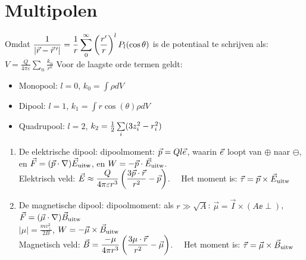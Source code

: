 \documentclass[twoside]{report}
\begin{document}
\section{Multipolen}
Omdat
$\displaystyle
\frac{1}{|\vec{r}-\vec{r}\,'|}=\frac{1}{r}\sum_0^\infty\left(\frac{r'}{r}\right)^lP_l(\cos\theta)
$ is de potentiaal te schrijven als:
$\displaystyle V=\frac{Q}{4\pi\varepsilon}\sum_n\frac{k_n}{r^n}$
\npar
Voor de laagste orde termen geldt:
\begin{itemize}
\item Monopool: $l=0$, $k_0=\int\rho dV$
\item Dipool: $l=1$, $k_1=\int r\cos(\theta)\rho dV$
\item Quadrupool: $l=2$, $k_2=\mbox{$\frac{1}{2}$}\sum\limits_i(3z^2_i-r^2_i)$
\end{itemize}
\begin{enumerate}
\item De elektrische dipool: dipoolmoment: $\vec{p}=Ql\vec{e}_{\rm }$, waarin $\vec{e}_{\rm }$
      loopt van $\oplus$ naar $\ominus$, en\linebreak
      $\vec{F}=(\vec{p}\cdot\nabla)\vec{E}_{\rm uitw}$, en
      $W=-\vec{p}\cdot\vec{E}_{\rm uitw}$.\\
      Elektrisch veld: $\displaystyle \vec{E}\approx\frac{Q}{4\pi\varepsilon r^3}\left(\frac{3\vec{p}\cdot\vec{r}}{r^2}-\vec{p}\right)$.~~
      Het moment is: $\vec{\tau}=\vec{p}\times\vec{E}_{\rm uitw}$
\item De magnetische dipool: dipoolmoment: als $r\gg\sqrt{A}$: $\vec{\mu}=\vec{I}\times(A\ee{\perp})$,
      $\vec{F}=(\vec{\mu}\cdot\nabla)\vec{B}_{\rm uitw}$\\
      $\displaystyle|\mu|=\frac{mv^2_\perp}{2B}$, $W=-\vec{\mu}\times\vec{B}_{\rm uitw}$\\
      Magnetisch veld: $\displaystyle\vec{B}=\frac{-\mu}{4\pi r^3}\left(\frac{3\mu\cdot\vec{r}}{r^2}-\vec{\mu}\right)$.~~
      Het moment is: $\vec{\tau}=\vec{\mu}\times\vec{B}_{\rm uitw}$
\end{enumerate}
\end{document}
